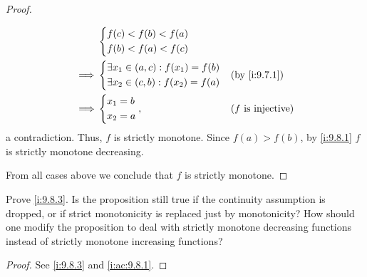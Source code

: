 \begin{proof}
\begin{itemize}
\begin{align*}
                     & \begin{dcases}
                         f(c) < f(b) < f(a) \\
                         f(b) < f(a) < f(c)
                       \end{dcases}                                                        \\
            \implies & \begin{dcases}
                         \exists x_1 \in (a, c) : f(x_1) = f(b) \\
                         \exists x_2 \in (c, b) : f(x_2) = f(a) \\
                       \end{dcases} &  & \by{i:9.7.1}                                    \\
            \implies & \begin{dcases}
                         x_1 = b \\
                         x_2 = a
                       \end{dcases},                            &  & \text{(\(f\) is injective)}
          \end{align*}
          a contradiction.
          Thus, \(f\) is strictly monotone.
          Since \(f(a) > f(b)\), by \cref{i:9.8.1} \(f\) is strictly monotone decreasing.
  \end{itemize}
  From all cases above we conclude that \(f\) is strictly monotone.
\end{proof}

\begin{ex}\label{i:ex:9.8.4}
  Prove \cref{i:9.8.3}.
  Is the proposition still true if the continuity assumption is dropped, or if strict monotonicity is replaced just by monotonicity?
  How should one modify the proposition to deal with strictly monotone decreasing functions instead of strictly monotone increasing functions?
\end{ex}

\begin{proof}
  See \cref{i:9.8.3} and \cref{i:ac:9.8.1}.
\end{proof}


